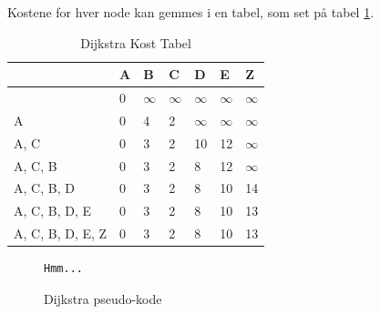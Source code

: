 Kostene for hver node kan gemmes i en tabel, som set på tabel \ref{dijktabel}.
	
\begin{table}[H]
\centering
	\begin{tabular}{|l|l|l|l|l|l|l|}
	\hline
	                 & A & B & C & D  & E  & Z  \\ \hline
	                 & 0 & $\infty$ & $\infty$ & $\infty$  & $\infty$  & $\infty$  \\ \hline
	A                & 0 & 4 & 2 & $\infty$  & $\infty$  & $\infty$  \\ \hline
	A, C             & 0 & 3 & 2 & 10 & 12 & $\infty$  \\ \hline
	A, C, B          & 0 & 3 & 2 & 8  & 12 & $\infty$  \\ \hline
	A, C, B, D       & 0 & 3 & 2 & 8  & 10 & 14 \\ \hline
	A, C, B, D, E    & 0 & 3 & 2 & 8  & 10 & 13 \\ \hline
	A, C, B, D, E, Z & 0 & 3 & 2 & 8  & 10 & 13 \\ \hline
	\end{tabular}
	\label{dijktabel}
	\caption{Dijkstra Kost Tabel}
\end{table}

\begin{figure}[H]
\begin{lstlisting}
Hmm...
\end{lstlisting}
\caption{Dijkstra pseudo-kode}\label{DijkstraCode}
\end{figure}